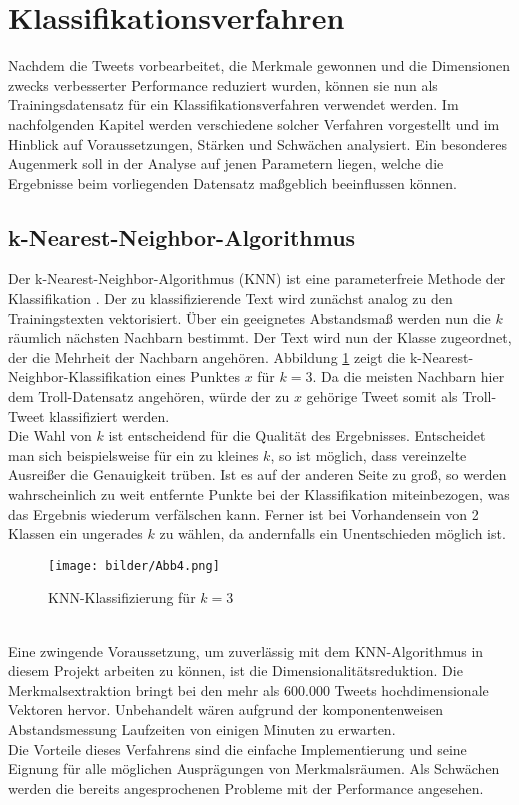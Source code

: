\section{Klassifikationsverfahren}\raggedbottom
Nachdem die Tweets vorbearbeitet, die Merkmale gewonnen und die Dimensionen zwecks verbesserter Performance reduziert wurden, können sie nun als Trainingsdatensatz für ein Klassifikationsverfahren verwendet werden. Im nachfolgenden Kapitel werden verschiedene solcher Verfahren vorgestellt und im Hinblick auf Voraussetzungen, Stärken und Schwächen analysiert. Ein besonderes Augenmerk soll in der Analyse auf jenen Parametern liegen, welche die Ergebnisse beim vorliegenden Datensatz maßgeblich beeinflussen können.    
\subsection{k-Nearest-Neighbor-Algorithmus}
Der k-Nearest-Neighbor-Algorithmus (KNN) ist eine parameterfreie Methode der Klassifikation \citep{Guo04}. Der zu klassifizierende Text wird zunächst analog zu den Trainingstexten vektorisiert. Über ein geeignetes Abstandsmaß werden nun die $k$ räumlich nächsten Nachbarn bestimmt. Der Text wird nun der Klasse zugeordnet, der die Mehrheit der Nachbarn angehören. Abbildung \ref{knn-alg} zeigt die k-Nearest-Neighbor-Klassifikation eines Punktes $x$ für $k=3$. Da die meisten Nachbarn hier dem Troll-Datensatz angehören, würde der zu $x$ gehörige Tweet somit als Troll-Tweet klassifiziert werden.\\
Die Wahl von $k$ ist entscheidend für die Qualität des Ergebnisses. Entscheidet man sich beispielsweise für ein zu kleines $k$, so ist möglich, dass vereinzelte Ausreißer die Genauigkeit trüben. Ist es auf der anderen Seite zu groß, so werden wahrscheinlich zu weit entfernte Punkte bei der Klassifikation miteinbezogen, was das Ergebnis wiederum verfälschen kann. Ferner ist bei Vorhandensein von 2 Klassen ein ungerades $k$ zu wählen, da andernfalls ein Unentschieden möglich ist.\\
\begin{figure}[htb]
	\begin{center}
		\texttt{[image: bilder/Abb4.png]}
		\caption{KNN-Klassifizierung für $k=3$}\label{knn-alg}
	\end{center}
\end{figure}\\
Eine zwingende Voraussetzung, um zuverlässig mit dem KNN-Algorithmus in diesem Projekt arbeiten zu können, ist die Dimensionalitätsreduktion. Die Merkmalsextraktion bringt bei den mehr als 600.000 Tweets hochdimensionale Vektoren hervor. Unbehandelt wären aufgrund der komponentenweisen Abstandsmessung Laufzeiten von einigen Minuten zu erwarten.\\
Die Vorteile dieses Verfahrens sind die einfache Implementierung und seine Eignung für alle möglichen Ausprägungen von Merkmalsräumen. Als Schwächen werden die bereits angesprochenen Probleme mit der Performance angesehen.
